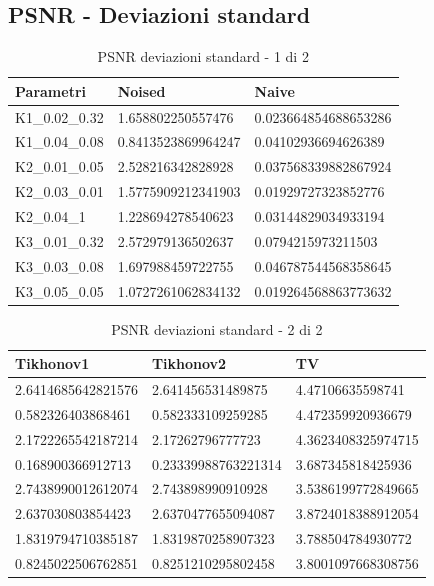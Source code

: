 \documentclass[12pt]{article}
\begin{document}
    \newpage
    \subsection{PSNR - Deviazioni standard}

    \begin{table}[!ht]
    \centering
    \begin{tabular}{|l|l|l|}
    \hline
        Parametri & Noised & Naive \\ \hline
        K1\_0.02\_0.32 & 1.658802250557476 & 0.023664854688653286 \\ \hline
        K1\_0.04\_0.08 & 0.8413523869964247 & 0.04102936694626389 \\ \hline
        K2\_0.01\_0.05 & 2.528216342828928 & 0.037568339882867924 \\ \hline
        K2\_0.03\_0.01 & 1.5775909212341903 & 0.01929727323852776 \\ \hline
        K2\_0.04\_1 & 1.228694278540623 & 0.03144829034933194 \\ \hline
        K3\_0.01\_0.32 & 2.572979136502637 & 0.0794215973211503 \\ \hline
        K3\_0.03\_0.08 & 1.697988459722755 & 0.046787544568358645 \\ \hline
        K3\_0.05\_0.05 & 1.0727261062834132 & 0.019264568863773632 \\ \hline
    \end{tabular}
    \caption{PSNR deviazioni standard - 1 di 2}
    \label{table:8}
    \end{table}

    \begin{table}[!ht]
    \centering
    \begin{tabular}{|l|l|l|}
    \hline
        Tikhonov1 & Tikhonov2 & TV \\ \hline
        2.6414685642821576 & 2.641456531489875 & 4.47106635598741 \\ \hline
        0.582326403868461 & 0.582333109259285 & 4.472359920936679 \\ \hline
        2.1722265542187214 & 2.17262796777723 & 4.3623408325974715 \\ \hline
        0.168900366912713 & 0.23339988763221314 & 3.687345818425936 \\ \hline
        2.7438990012612074 & 2.743898990910928 & 3.5386199772849665 \\ \hline
        2.637030803854423 & 2.6370477655094087 & 3.8724018388912054 \\ \hline
        1.8319794710385187 & 1.8319870258907323 & 3.788504784930772 \\ \hline
        0.8245022506762851 & 0.8251210295802458 & 3.8001097668308756 \\ \hline
    \end{tabular}
    \caption{PSNR deviazioni standard - 2 di 2}
    \label{table:9}
    \end{table}
    \newpage
\end{document}
